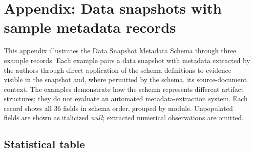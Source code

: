 \documentclass{article}
\begin{document}
\section{Appendix: Data snapshots with sample metadata records}
\label{appendix:sample_metadata}

This appendix illustrates the Data Snapshot Metadata Schema through three example records. Each example pairs a data snapshot with metadata extracted by the authors through direct application of the schema definitions to evidence visible in the snapshot and, where permitted by the schema, its source-document context. The examples demonstrate how the schema represents different artifact structures; they do not evaluate an automated metadata-extraction system. Each record shows all 36 fields in schema order, grouped by module. Unpopulated fields are shown as italicized \textit{null}; extracted numerical observations are omitted.

\clearpage

\subsection{Statistical table}
\end{document}
